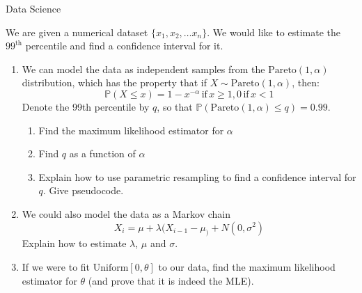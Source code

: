 \documentclass{tripos}  %
\begin{document}
\begin{question}[MockIB,year=2024,paper=2,question=2,author=rrw]{Data Science}


  We are given a numerical dataset $\{ x_1, x_2, \dots{} x_n\}$. We would like to estimate the ${99}^{\mbox{th}}$ percentile and find a confidence interval for it.
  
  \begin{enumerate}
  \item We can model the data as independent samples from the $\mbox{Pareto}(1,\alpha)$ distribution, which has the property that if $X \sim{} \mbox{Pareto}(1,\alpha{})$, then:
    \[
    \mathbb{P}(X \leq x) = 1-x^{-\alpha}\, \mbox{if}\, x \ge 1 , 0\,\mbox{if}\, x < 1
    \]
     Denote the 99th percentile by $q$, so that $\mathbb{P}(\mbox{Pareto}(1,\alpha{}) \le q) = 0.99$.
    \begin{enumerate}
    \item Find the maximum likelihood estimator for $\alpha$ 
    \item Find $q$ as a function of $\alpha$ 
    \item Explain how to use parametric resampling to find a confidence interval for $q$. Give pseudocode. 
    \end{enumerate}
  \item We could also model the data as a Markov chain
    \[
    X_i = \mu{} + \lambda{}(X_{i-1}-\mu_) + N(0,\sigma^2)
    \]
    Explain how to estimate $\lambda{}$, $\mu{}$ and $\sigma{}$.
\item If we were to fit $\mbox{Uniform}[0,\theta]$ to our data, find the maximum likelihood estimator for $\theta$ (and prove that it is indeed the MLE). 
    \end{enumerate}

\end{question}
\end{document}
